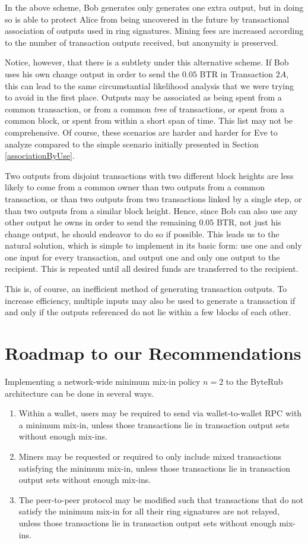 \documentclass[12pt,english]{mrl}
\theoremstyle{definition}
\numberwithin{equation}{section}
\numberwithin{figure}{section}
\numberwithin{equation}{section}
\numberwithin{equation}{section}
\numberwithin{figure}{section}
\begin{document}
In the above scheme, Bob generates only generates one extra output, but in doing so is able to protect Alice from being uncovered in the future by transactional association of outputs used in ring signatures.  Mining fees are increased according to the number of transaction outputs received, but anonymity is preserved. 

Notice, however, that there is a subtlety under this alternative scheme. If Bob uses his own change output in order to send the $0.05$ BTR in Transaction $2A$, this can lead to the same circumstantial likelihood analysis that we were trying to avoid in the first place. Outputs may be associated as being spent from a common transaction, or from a common \textit{tree} of transactions, or spent from a common block, or spent from within a short span of time. This list may not be comprehensive. Of course, these scenarios are harder and harder for Eve to analyze compared to the simple scenario initially presented in Section \ref{associationByUse}. 

Two outputs from disjoint transactions with two different block heights are less likely to come from a common owner than two outputs from a common transaction, or than two outputs from two transactions linked by a single step, or than two outputs from a similar block height. Hence, since Bob can also use any other output he owns in order to send the remaining $0.05$ BTR, not just his change output, he should endeavor to do so if possible. This leads us to the natural solution, which is simple to implement in its basic form: use one and only one input for every transaction, and output one and only one output to the recipient. This is repeated until all desired funds are transferred to the recipient.

This is, of course, an inefficient method of generating transaction outputs. To increase efficiency, multiple inputs may also be used to generate a transaction if and only if the outputs referenced do not lie within a few blocks of each other.


\section{Roadmap to our Recommendations}\label{softwareImplementation}

Implementing a network-wide minimum mix-in policy $n=2$ to the ByteRub architecture can be done in several ways.
\begin{enumerate}[(1)]
\item Within a wallet, users may be required to send via wallet-to-wallet RPC with a minimum mix-in, unless those transactions lie in transaction output sets without enough mix-ins.
\item Miners may be requested or required to only include mixed transactions satisfying the minimum mix-in, unless those transactions lie in transaction output sets without enough mix-ins.
\item The peer-to-peer protocol may be modified such that transactions that do not satisfy the minimum mix-in for all their ring signatures are not relayed, unless those transactions lie in transaction output sets without enough mix-ins.
\end{enumerate}
\end{document}
